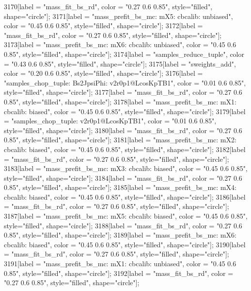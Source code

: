 {	3170[label = "mass_fit_bs_rd", color = "0.27 0.6 0.85", style="filled", shape="circle"];
	3171[label = "mass_prefit_bs_mc\nmassbin: mX5\nmassmodel: cbcalib\ntrigger: unbiased", color = "0.45 0.6 0.85", style="filled", shape="circle"];
	3172[label = "mass_fit_bs_rd", color = "0.27 0.6 0.85", style="filled", shape="circle"];
	3173[label = "mass_prefit_bs_mc\nmassbin: mX6\nmassmodel: cbcalib\ntrigger: unbiased", color = "0.45 0.6 0.85", style="filled", shape="circle"];
	3174[label = "samples_reduce_tuple", color = "0.43 0.6 0.85", style="filled", shape="circle"];
	3175[label = "sweights_add", color = "0.20 0.6 0.85", style="filled", shape="circle"];
	3176[label = "samples_chop_tuple\nmode: Bs2JpsiPhi\nversion: v2r0p1@LcosKpTB1", color = "0.01 0.6 0.85", style="filled", shape="circle"];
	3177[label = "mass_fit_bs_rd", color = "0.27 0.6 0.85", style="filled", shape="circle"];
	3178[label = "mass_prefit_bs_mc\nmassbin: mX1\nmassmodel: cbcalib\ntrigger: biased", color = "0.45 0.6 0.85", style="filled", shape="circle"];
	3179[label = "samples_chop_tuple\nversion: v2r0p1@LcosKpTB1", color = "0.01 0.6 0.85", style="filled", shape="circle"];
	3180[label = "mass_fit_bs_rd", color = "0.27 0.6 0.85", style="filled", shape="circle"];
	3181[label = "mass_prefit_bs_mc\nmassbin: mX2\nmassmodel: cbcalib\ntrigger: biased", color = "0.45 0.6 0.85", style="filled", shape="circle"];
	3182[label = "mass_fit_bs_rd", color = "0.27 0.6 0.85", style="filled", shape="circle"];
	3183[label = "mass_prefit_bs_mc\nmassbin: mX3\nmassmodel: cbcalib\ntrigger: biased", color = "0.45 0.6 0.85", style="filled", shape="circle"];
	3184[label = "mass_fit_bs_rd", color = "0.27 0.6 0.85", style="filled", shape="circle"];
	3185[label = "mass_prefit_bs_mc\nmassbin: mX4\nmassmodel: cbcalib\ntrigger: biased", color = "0.45 0.6 0.85", style="filled", shape="circle"];
	3186[label = "mass_fit_bs_rd", color = "0.27 0.6 0.85", style="filled", shape="circle"];
	3187[label = "mass_prefit_bs_mc\nmassbin: mX5\nmassmodel: cbcalib\ntrigger: biased", color = "0.45 0.6 0.85", style="filled", shape="circle"];
	3188[label = "mass_fit_bs_rd", color = "0.27 0.6 0.85", style="filled", shape="circle"];
	3189[label = "mass_prefit_bs_mc\nmassbin: mX6\nmassmodel: cbcalib\ntrigger: biased", color = "0.45 0.6 0.85", style="filled", shape="circle"];
	3190[label = "mass_fit_bs_rd", color = "0.27 0.6 0.85", style="filled", shape="circle"];
	3191[label = "mass_prefit_bs_mc\nmassbin: mX1\nmassmodel: cbcalib\ntrigger: unbiased", color = "0.45 0.6 0.85", style="filled", shape="circle"];
	3192[label = "mass_fit_bs_rd", color = "0.27 0.6 0.85", style="filled", shape="circle"];
}
